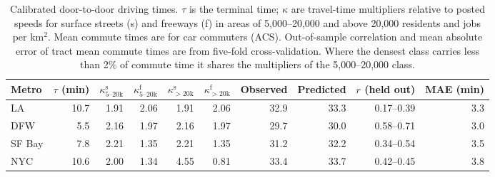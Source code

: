 \begin{table}[!htbp]
\centering
\caption{Calibrated door-to-door driving times. $\tau$ is the terminal time; $\kappa$ are travel-time multipliers relative to posted speeds for surface streets (s) and freeways (f) in areas of 5{,}000--20{,}000 and above 20{,}000 residents and jobs per km$^2$. Mean commute times are for car commuters (ACS). Out-of-sample correlation and mean absolute error of tract mean commute times are from five-fold cross-validation. Where the densest class carries less than 2\% of commute time it shares the multipliers of the 5{,}000--20{,}000 class.}
\label{tab:calibration}
\footnotesize
\begin{tabular}{lrrrrrrrrr}
\toprule
Metro & $\tau$ (min) & $\kappa^{\mathrm{s}}_{5\text{--}20\mathrm{k}}$ & $\kappa^{\mathrm{f}}_{5\text{--}20\mathrm{k}}$ & $\kappa^{\mathrm{s}}_{>20\mathrm{k}}$ & $\kappa^{\mathrm{f}}_{>20\mathrm{k}}$ & Observed & Predicted & $r$ (held out) & MAE (min) \\
\midrule
LA & 10.7 & 1.91 & 2.06 & 1.91 & 2.06 & 32.9 & 33.3 & 0.17--0.39 & 3.3 \\
DFW & 5.5 & 2.16 & 1.97 & 2.16 & 1.97 & 29.7 & 30.0 & 0.58--0.71 & 3.0 \\
SF Bay & 7.8 & 2.21 & 1.35 & 2.21 & 1.35 & 31.2 & 32.2 & 0.34--0.54 & 3.5 \\
NYC & 10.6 & 2.00 & 1.34 & 4.55 & 0.81 & 33.4 & 33.7 & 0.42--0.45 & 3.8 \\
\bottomrule
\end{tabular}
\end{table}
